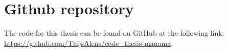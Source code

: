 \chapter{Github repository}
The code for this thesis can be found on GitHub at the following link: \url{https://github.com/ThijsAlens/code_thesis-manama}.